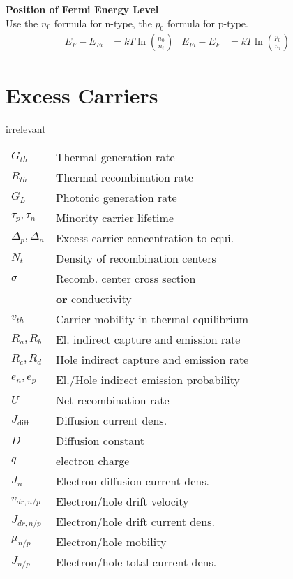 \documentclass[a4paper, fontsize=8pt, landscape, DIV=1]{scrartcl}
\newcommand{\makeultracompact}{irrelevant}
\begin{document}
\begin{multicols*}{4}
    \textbf{Position of Fermi Energy Level} \\
    Use the $n_0$ formula for n-type, the $p_0$ formula for p-type.
      \begin{align*}
        E_F-E_{Fi} &= kT\ln\left(\frac{n_0}{n_i}\right) &
        E_{Fi}-E_{F} &= kT\ln\left(\frac{p_0}{n_i}\right) &
      \end{align*}

  \section{Excess Carriers}

  \ifdefined\makeultracompact
  \else
    \begin{tabular}[h]{l l}
      $G_{th}$   & Thermal generation rate \\
      $R_{th}$   & Thermal recombination rate \\
      $G_{L}$    & Photonic generation rate \\
      $\tau_p, \tau_n$   & Minority carrier lifetime \\
      $\Delta_p, \Delta_n$   & Excess carrier concentration to equi. \\
      $N_t$    & Density of recombination centers \\
      $\sigma$    & Recomb. center cross section \\
      {}    & \textbf{or} conductivity \\
      $v_{th}$    & Carrier mobility in thermal equilibrium \\
      $R_a,R_b$    & El. indirect capture and emission rate \\
      $R_c,R_d$    & Hole indirect capture and emission rate \\
      $e_n,e_p$    & El./Hole indirect emission probability \\
      $U$    & Net recombination rate \\
      $J_{\text{diff}}$ & Diffusion current dens. \\
      $D$ & Diffusion constant \\
      $q$ & electron charge \\
      $J_n$ & Electron diffusion current dens.\\
      $v_{dr,n/p}$ & Electron/hole drift velocity \\
      $J_{dr,n/p}$ & Electron/hole drift current dens.\\
      $\mu_{n/p}$ & Electron/hole mobility \\
      $J_{n/p}$ & Electron/hole total current dens. \\
    \end{tabular}
  \fi


\end{multicols*}
\end{document}
